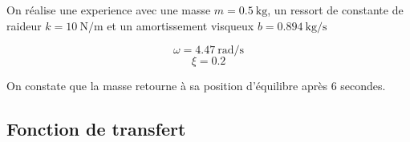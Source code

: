 On réalise une experience avec une masse $m=\SI{0.5}{\kilogram}$, un ressort 
de constante de raideur $k=\SI{10}{\newton\per\meter}$ et un amortissement 
visqueux $b=\SI{0.894}{\kilogram\per\second}$

\question{}
\[
    \omega=\SI{4.47}{\radian\per\second}
\]
\[
    \xi=0.2
\]

\question{}
On constate que la masse retourne à sa position d'équilibre après 6 secondes.
\begin{figure}[!h]
    \centering
    
\end{figure}

\subsection*{Fonction de transfert}


